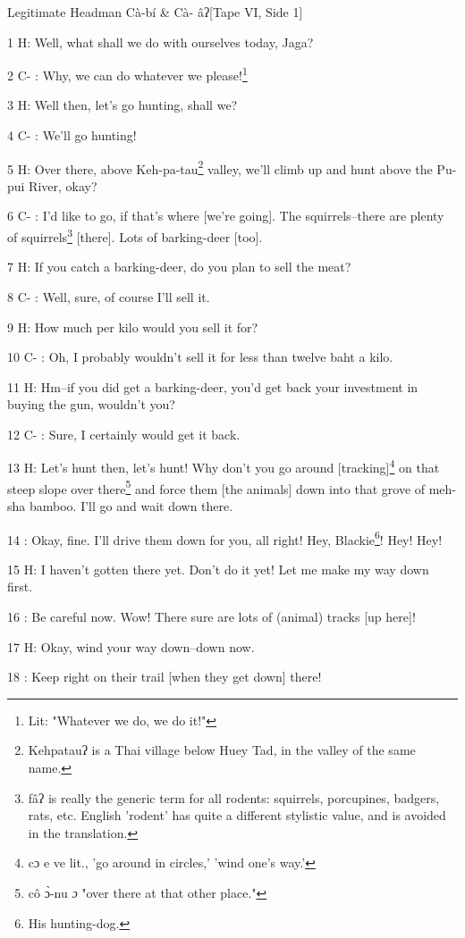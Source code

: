 
Legitimate Headman Cà-bí \& Cà- âʔ[Tape VI, Side 1]

1 H: Well, what shall we do with ourselves today, Jaga?

2 C- : Why, we can do whatever we please!\footnote{Lit: "Whatever we do, we do it!"}

3 H: Well then, let's go hunting, shall we?

4 C- : We'll go hunting!

5 H: Over there, above Keh-pa-tau\footnote{Kehpatauʔ is a Thai village below Huey Tad, in the valley of the same name.} valley, we'll climb up and hunt above the
Pu-pui River, okay?

6 C- : I'd like to go, if that's where [we're going]. The squirrels--there are
plenty of squirrels\footnote{fâʔ is really the generic term for all rodents: squirrels, porcupines, badgers, rats, etc. English 'rodent' has quite a different stylistic value, and is avoided in the translation.} [there]. Lots of barking-deer [too].

7 H: If you catch a barking-deer, do you plan to sell the meat?

8 C- : Well, sure, of course I'll sell it.

9 H: How much per kilo would you sell it for?

10 C- : Oh, I probably wouldn't sell it for less than twelve baht a kilo.

11 H: Hm--if you did get a barking-deer, you'd get back your investment in buying
the gun, wouldn't you?

12 C- : Sure, I certainly would get it back.

13 H: Let's hunt then, let's hunt! Why don't you go around [tracking]\footnote{cɔ e ve lit., 'go around in circles,' 'wind one's way.'} on that
steep slope over there\footnote{cô ɔ̀-nu \emph{ɔ} "over there at that other place."} and force them [the animals] down into that grove of
meh-sha bamboo. I'll go and wait down there.

14  : Okay, fine. I'll drive them down for you, all right! Hey, Blackie\footnote{His hunting-dog.}! Hey!
Hey!

15 H: I haven't gotten there yet. Don't do it yet! Let me make my way down first.

16  : Be careful now. Wow! There sure are lots of (animal) tracks [up here]!

17 H: Okay, wind your way down--down now.

18  : Keep right on their trail [when they get down] there!

